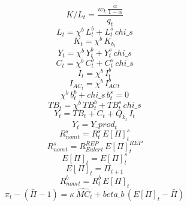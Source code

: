 \documentclass[10pt,a4paper]{article}
\begin{document}
\begin{dmath}
K/L_{t}=\frac{w_{t}\, \frac{\alpha }{1-\alpha }}{q_{t}}
\end{dmath}
\begin{dmath}
L_{t}=\chi^b \, L^b_{t}+L^s_{t}\, chi\_s
\end{dmath}
\begin{dmath}
K_{t}=\chi^b \, K_b_{t}
\end{dmath}
\begin{dmath}
Y_{t}=\chi^b \, Y^b_{t}+Y^s_{t}\, chi\_s
\end{dmath}
\begin{dmath}
C_{t}=\chi^b \, C^b_{t}+C^s_{t}\, chi\_s
\end{dmath}
\begin{dmath}
I_{t}=\chi^b \, I^b_{t}
\end{dmath}
\begin{dmath}
I_{AC}_{t}=\chi^b \, I_{AC}^b_{t}
\end{dmath}
\begin{dmath}
\chi^b \, b^b_{t}+chi\_s\, b^s_{t}=0
\end{dmath}
\begin{dmath}
TB_{t}=\chi^b \, TB^b_{t}+TB^s_{t}\, chi\_s
\end{dmath}
\begin{dmath}
Y_{t}=TB_{t}+C_{t}+ Q_k _{t}\, I_{t}
\end{dmath}
\begin{dmath}
Y_{t}=Y\_prod_{t}
\end{dmath}
\begin{dmath}
 R^s_{nom}_{t}=R^s_{t}\,  E[\Pi]^{s} _{t}
\end{dmath}
\begin{dmath}
 R^s_{nom}_{t}= R^{REP}_{Euler} _{t}\,  E[\Pi]^{REP} _{t}
\end{dmath}
\begin{dmath}
 E[\Pi] _{t}= E[\Pi]^{s} _{t}
\end{dmath}
\begin{dmath}
 E[\Pi] _{t}= \Pi _{t+1}
\end{dmath}
\begin{dmath}
 R^b_{nom}_{t}=R^b_{t}\,  E[\Pi] _{t}
\end{dmath}
\begin{dmath}
 \pi _{t}-\left( \bar{\Pi} -1\right)=\kappa\,  \hat{MC} _{t}+beta\_b\, \left( E[\Pi] _{t}- \bar{\Pi} \right)
\end{dmath}
\end{document}
